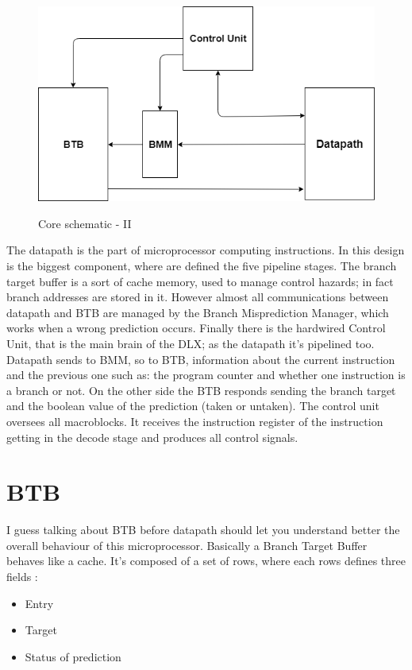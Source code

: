 \begin{figure}[H]
\centering
\includegraphics[scale=.6]{Immagini/07}
\label{02}
\caption{Core schematic - II}
\end{figure}
The datapath is the part of microprocessor computing instructions. In this design is the biggest component, where are defined the five pipeline stages. The branch target buffer is a sort of cache memory, used to manage control hazards; in fact branch addresses are stored in it. However almost all communications between datapath and BTB are managed by the Branch Misprediction Manager, which works when a wrong prediction occurs. Finally there is the hardwired Control Unit, that is the main brain of the DLX; as the datapath it's pipelined too.\newline
Datapath sends to BMM, so to BTB, information about the current instruction and the previous one such as: the program counter and whether one instruction is a branch or not. On the other side the BTB responds sending the branch target and the boolean value of the prediction (taken or untaken). The control unit oversees all macroblocks. It receives the instruction register of the instruction getting in the decode stage and produces all control signals.

\section{BTB}

I guess talking about BTB before datapath should let you understand better the overall behaviour of this microprocessor. Basically a Branch Target Buffer behaves like a cache. It's composed of a set of rows, where each rows defines three fields :
\begin{itemize}
\item Entry
\item Target
\item Status of prediction
\end{itemize}

